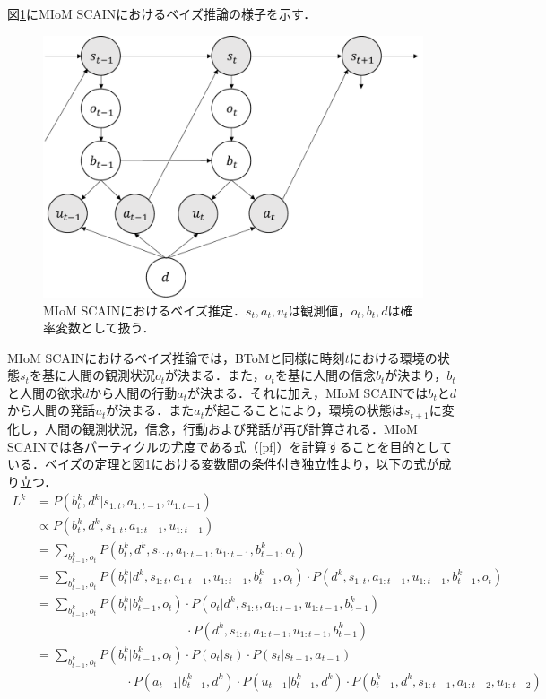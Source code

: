 \par
図\ref{fig:miom}にMIoM SCAINにおけるベイズ推論の様子を示す．
\begin{figure}[htbp]
  \begin{center}
    \includegraphics[scale=0.73]{./miom.pdf}
    \caption{MIoM SCAINにおけるベイズ推定．$s_t, a_t, u_t$は観測値，$o_t, b_t, d$は確率変数として扱う．}
    \label{fig:miom}
  \end{center}
\end{figure}
MIoM SCAINにおけるベイズ推論では，BToMと同様に時刻$t$における環境の状態$s_{t}$を基に人間の観測状況$o_{t}$が決まる．また，$o_{t}$を基に人間の信念$b_{t}$が決まり，$b_{t}$と人間の欲求$d$から人間の行動$a_{t}$が決まる．それに加え，MIoM SCAINでは$b_t$と$d$から人間の発話$u_t$が決まる．また$a_{t}$が起こることにより，環境の状態は$s_{t+1}$に変化し，人間の観測状況，信念，行動および発話が再び計算される．MIoM SCAINでは各パーティクルの尤度である式（\ref{pf}）を計算することを目的としている．ベイズの定理と図\ref{fig:miom}における変数間の条件付き独立性より，以下の式が成り立つ．
\begin{equation}
  \begin{split}
  \label{eq_miom}
  L^k&=P(b_t^k,d^k|s_{1:t},a_{1:t-1},u_{1:t-1})\\
  &\propto P(b_t^k,d^k,s_{1:t},a_{1:t-1},u_{1:t-1})\\
  &= \sum_{b_{t-1}^k,o_t}P(b_t^k,d^k,s_{1:t},a_{1:t-1},u_{1:t-1},b_{t-1}^k,o_t)\\
  &= \sum_{b_{t-1}^k,o_t}P(b_t^k|d^k,s_{1:t},a_{1:t-1},u_{1:t-1},b_{t-1}^k,o_t)\cdot P(d^k,s_{1:t},a_{1:t-1},u_{1:t-1},b_{t-1}^k,o_t)\\
  &= \sum_{b_{t-1}^k,o_t}P(b_t^k|b_{t-1}^k,o_t)\cdot P(o_t|d^k,s_{1:t},a_{1:t-1},u_{1:t-1},b_{t-1}^k)\\
  &\hspace{5cm} \cdot P(d^k,s_{1:t},a_{1:t-1},u_{1:t-1},b_{t-1}^k)\\
  &= \sum_{b_{t-1}^k,o_t}P(b_t^k|b_{t-1}^k,o_t)\cdot P(o_t|s_t)\cdot P(s_t|s_{t-1},a_{t-1})\\
  &\hspace{3cm} \cdot P(a_{t-1}|b_{t-1}^k,d^k)\cdot P(u_{t-1}|b_{t-1}^k,d^k)\cdot P(b_{t-1}^k,d^k,s_{1:t-1},a_{1:t-2},u_{1:t-2})\\
  \end{split}
\end{equation}
